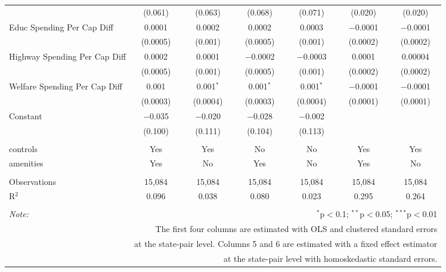 \begin{table}[!htbp]
\begin{tabular}{@{\extracolsep{5pt}}lcccccc}
  & (0.061) & (0.063) & (0.068) & (0.071) & (0.020) & (0.020) \\ 
  Educ Spending Per Cap Diff & 0.0001 & 0.0002 & 0.0002 & 0.0003 & $-$0.0001 & $-$0.0001 \\ 
  & (0.0005) & (0.001) & (0.0005) & (0.001) & (0.0002) & (0.0002) \\ 
  Highway Spending Per Cap Diff & 0.0002 & 0.0001 & $-$0.0002 & $-$0.0003 & 0.0001 & 0.00004 \\ 
  & (0.0005) & (0.001) & (0.0005) & (0.001) & (0.0002) & (0.0002) \\ 
  Welfare Spending Per Cap Diff & 0.001 & 0.001$^{*}$ & 0.001$^{*}$ & 0.001$^{*}$ & $-$0.0001 & $-$0.0001 \\ 
  & (0.0003) & (0.0004) & (0.0003) & (0.0004) & (0.0001) & (0.0001) \\ 
  Constant & $-$0.035 & $-$0.020 & $-$0.028 & $-$0.002 &  &  \\ 
  & (0.100) & (0.111) & (0.104) & (0.113) &  &  \\ 
 \hline \\[-1.8ex] 
controls & Yes & Yes & No & No & Yes & Yes \\ 
amenities & Yes & No & Yes & No & Yes & No \\ 
\hline \\[-1.8ex] 
Observations & 15,084 & 15,084 & 15,084 & 15,084 & 15,084 & 15,084 \\ 
R$^{2}$ & 0.096 & 0.038 & 0.080 & 0.023 & 0.295 & 0.264 \\ 
\hline 
\hline \\[-1.8ex] 
\textit{Note:}  & \multicolumn{6}{r}{$^{*}$p$<$0.1; $^{**}$p$<$0.05; $^{***}$p$<$0.01} \\ 
 & \multicolumn{6}{r}{The first four columns are estimated with OLS and clustered standard errors} \\ 
 & \multicolumn{6}{r}{at the state-pair level. Columns 5 and 6 are estimated with a fixed effect estimator} \\ 
 & \multicolumn{6}{r}{at the state-pair level with homoskedastic standard errors.} \\ 
\end{tabular} 
\end{table} 
